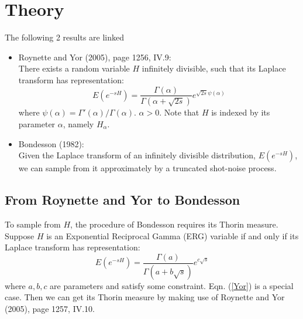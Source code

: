 \documentclass[11pt, oneside]{article}
\begin{document}
\section{Theory}
The following 2 results are linked
\begin{itemize}
\item 
Roynette and Yor (2005), page 1256, IV.9:\\
There exists a random variable $H$ infinitely divisible, such that its Laplace transform has representation:
\begin{equation}\label{Yor}
E(e^{-sH}) = \frac{\Gamma(\alpha)}{\Gamma(\alpha + \sqrt{2s})} e^{\sqrt{2s}\psi(\alpha)}
\end{equation}
where $\psi(\alpha) = \Gamma'(\alpha)/\Gamma(\alpha)$. $\alpha > 0.$ Note that $H$ is indexed by its parameter $\alpha$, namely $H_\alpha$.\\


\item 
Bondesson (1982):\\
Given the Laplace transform of an infinitely divisible distribution, $E(e^{-sH})$, we can sample from it approximately by a truncated shot-noise process. 
\end{itemize}

\subsection{From Roynette and Yor to Bondesson}
To sample from $H$, the procedure of Bondesson requires its Thorin measure. Suppose $H$ is an Exponential Reciprocal Gamma (ERG) variable if and only if its Laplace transform has representation:
\begin{equation}\label{def}
E(e^{-sH}) = \frac{\Gamma(a)}{\Gamma(a + b\sqrt{s})} e^{c\sqrt{s}}
\end{equation}
where $a, b, c$ are parameters and satisfy some constraint. Eqn. (\ref{Yor}) is a special case.  Then we can get its Thorin measure by making use of Roynette and Yor (2005), page 1257, IV.10.
\end{document}

